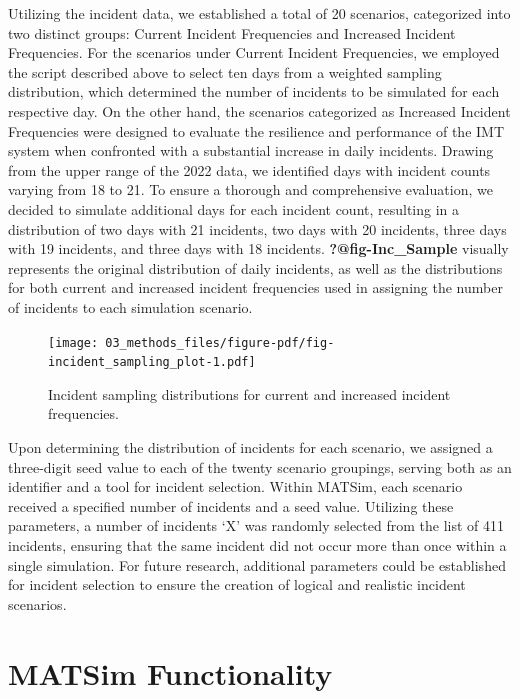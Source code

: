 \documentclass[fancy, oneside, mastersfancy, ms]{byuthesis}
\begin{document}
Utilizing the incident data, we established a total of 20 scenarios,
categorized into two distinct groups: Current Incident Frequencies and
Increased Incident Frequencies. For the scenarios under Current Incident
Frequencies, we employed the script described above to select ten days
from a weighted sampling distribution, which determined the number of
incidents to be simulated for each respective day. On the other hand,
the scenarios categorized as Increased Incident Frequencies were
designed to evaluate the resilience and performance of the IMT system
when confronted with a substantial increase in daily incidents. Drawing
from the upper range of the 2022 data, we identified days with incident
counts varying from 18 to 21. To ensure a thorough and comprehensive
evaluation, we decided to simulate additional days for each incident
count, resulting in a distribution of two days with 21 incidents, two
days with 20 incidents, three days with 19 incidents, and three days
with 18 incidents. \textbf{?@fig-Inc\_Sample} visually represents the
original distribution of daily incidents, as well as the distributions
for both current and increased incident frequencies used in assigning
the number of incidents to each simulation scenario.

\begin{figure}

{\centering \texttt{[image: 03\_methods\_files/figure-pdf/fig-incident\_sampling\_plot-1.pdf]}

}

\caption{\label{fig-incident_sampling_plot}Incident sampling
distributions for current and increased incident frequencies.}

\end{figure}

Upon determining the distribution of incidents for each scenario, we
assigned a three-digit seed value to each of the twenty scenario
groupings, serving both as an identifier and a tool for incident
selection. Within MATSim, each scenario received a specified number of
incidents and a seed value. Utilizing these parameters, a number of
incidents `X' was randomly selected from the list of 411 incidents,
ensuring that the same incident did not occur more than once within a
single simulation. For future research, additional parameters could be
established for incident selection to ensure the creation of logical and
realistic incident scenarios.

\hypertarget{matsim-functionality}{%
\section{MATSim Functionality}\label{matsim-functionality}}
\end{document}
